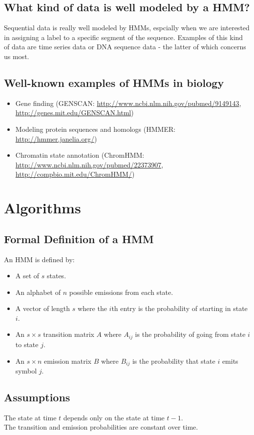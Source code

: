 \documentclass[11pt, oneside]{article}
\begin{document}
\subsection{What kind of data is well modeled by a HMM?}
Sequential data is really well modeled by HMMs, espcially when we are interested in assigning a label to a specific segment of the sequence. Examples of this kind of data are time series data or DNA sequence data - the latter of which concerns us most. 

\subsection{Well-known examples of HMMs in biology}

\begin{itemize}
\item Gene finding (GENSCAN: \url{http://www.ncbi.nlm.nih.gov/pubmed/9149143}, \url{http://genes.mit.edu/GENSCAN.html})
\item Modeling protein sequences and homologs (HMMER: \url{http://hmmer.janelia.org/})
\item Chromatin state annotation (ChromHMM: \url{http://www.ncbi.nlm.nih.gov/pubmed/22373907}, \url{http://compbio.mit.edu/ChromHMM/})
\end{itemize}

\section{Algorithms}
\subsection{Formal Definition of a HMM}
An HMM is defined by:
\begin{itemize}
\item A set of $s$ states.
\item An alphabet of $n$ possible emissions from each state.
\item A vector of length $s$ where the $i$th entry is the probability of starting in state $i$.
\item An $s\times s$ transition matrix $A$ where $A_{ij}$ is the probability of going from state $i$ to state $j$.
\item An $s \times n$ emission matrix $B$ where $B_{ij}$ is the probability that state $i$ emits symbol $j$.
\end{itemize}

\subsection{Assumptions}
The state at time $t$ depends only on the state at time $t-1$.\\
The transition and emission probabilities are constant over time.
\end{document}
